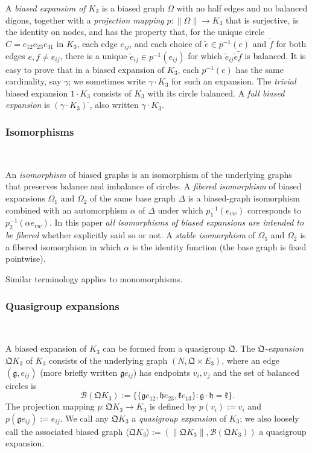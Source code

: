 \documentclass[reqno,12pt]{amsart}
\theoremstyle{remark}
\numberwithin{equation}{section}
\numberwithin{figure}{section}
\newcommand \inv{^{-1}}
\newcommand \bgr[1]{\langle#1\rangle}
\newcommand \full{^{{}^{{}_{{}_\bullet}}\!}}
\newcommand \cB{\mathcal{B}}
\newcommand \fQ{\mathfrak Q}
\newcommand \te{{\tilde e}}
\newcommand \tf{{\tilde f}}
\newcommand\Qg{\mathfrak g}
\newcommand\Qh{\mathfrak h}
\newcommand\Qk{\mathfrak k}
\begin{document}
A \emph{biased expansion of $K_3$} is a biased graph $\Omega$ with no half edges and no balanced digons, together with a \emph{projection mapping} $p: \|\Omega\| \to K_3$ that is surjective, is the identity on nodes, and has the property that, for the unique circle $C = e_{12} e_{23} e_{31}$ in $K_3$, each edge $e_{ij}$, and each choice of $\te \in p\inv(e)$ and $\tf$ for both edges $e,f \neq e_{ij}$, there is a unique $\te_{ij} \in p\inv(e_{ij})$ for which $\te_{ij} \te \tf$ is balanced.  
It is easy to prove that in a biased expansion of $K_3$, each $p\inv(e)$ has the same cardinality, say $\gamma$; we sometimes write $\gamma\cdot K_3$ for such an expansion.  
The \emph{trivial} biased expansion $1\cdot K_3$ consists of $K_3$ with its circle balanced.  
A \emph{full biased expansion} is $(\gamma\cdot K_3)\full$, also written $\gamma\cdot K_3\full$.

\subsubsection{Isomorphisms}\label{isom}\

An \emph{isomorphism} of biased graphs is an isomorphism of the underlying graphs that preserves balance and imbalance of circles.  
A \emph{fibered isomorphism} of biased expansions $\Omega_1$ and $\Omega_2$ of the same base graph $\Delta$ is a biased-graph isomorphism combined with an automorphism $\alpha$ of $\Delta$ under which $p_1\inv(e_{vw})$ corresponds to $p_2\inv(\alpha e_{vw})$.  In this paper \emph{all isomorphisms of biased expansions are intended to be fibered} whether explicitly said so or not.  
A \emph{stable isomorphism} of $\Omega_1$ and $\Omega_2$ is a fibered isomorphism in which $\alpha$ is the identity function (the base graph is fixed pointwise).

Similar terminology applies to monomorphisms.

\subsubsection{Quasigroup expansions}\label{qx3}\

A biased expansion of $K_3$ can be formed from a quasigroup $\fQ$.  
The \emph{$\fQ$-expansion} $\fQ K_3$ of $K_3$ consists of the underlying graph $(N, \fQ \times E_3)$, where an edge $(\Qg, e_{ij})$ (more briefly written $\Qg e_{ij}$) has endpoints $v_i,v_j $ and the set of balanced circles is 
$$
\cB(\fQ K_3) := \{ \{\Qg e_{12},  \Qh e_{23},  \Qk e_{13}\}  : \Qg \cdot \Qh = \Qk \}.
$$  
The projection mapping $p: \fQ K_3 \to K_3$ is defined by $p(v_i):=v_i$ and $p(\Qg e_{ij}) := e_{ij}.$  
We call any $\fQ K_3$ a \emph{quasigroup expansion} of $K_3$; we also loosely call the associated biased graph $\bgr{\fQ K_3} := (\|\fQ K_3\|, \cB(\fQ K_3))$ a quasigroup expansion.  
\end{document}
